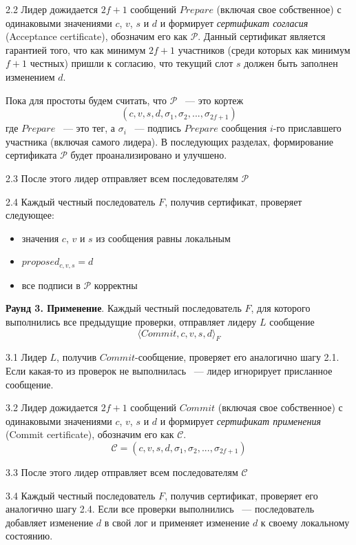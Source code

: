 2.2 Лидер дожидается $2f+1$ сообщений $Prepare$ (включая свое собственное) с одинаковыми значениями $c$, $v$, $s$ и $d$ и формирует \textit{сертификат согласия} (Acceptance certificate), обозначим его как $\mathcal{P}$. Данный сертификат является гарантией того, что как минимум $2f+1$ участников (среди которых как минимум $f+1$ честных) пришли к согласию, что текущий слот $s$ должен быть заполнен изменением $d$.

Пока для простоты будем считать, что $\mathcal{P}$ ~--- это кортеж
$$(c, v, s, d, \sigma_1, \sigma_2, ..., \sigma_{2f+1})$$
где $Prepare$ ~--- это тег, а $\sigma_i$ ~--- подпись $Prepare$ сообщения $i$-го приславшего участника (включая самого лидера). 
В последующих разделах, формирование сертификата $\mathcal{P}$ будет проанализировано и улучшено.

2.3 После этого лидер отправляет всем последователям  $\mathcal{P}$

2.4 Каждый честный последователь $F$, получив сертификат, проверяет следующее:
\begin{itemize}
\item значения $c$, $v$ и $s$ из сообщения равны локальным
\item $proposed_{c,v,s} = d$
\item все подписи в $\mathcal{P}$ корректны
\end{itemize}
\vspace{10pt}

\textbf{Раунд 3. Применение}.
Каждый честный последователь $F$, для которого выполнились все предыдущие проверки, отправляет лидеру $L$ сообщение 
\[ \langle Commit, c, v, s, d \rangle_F \]

3.1 Лидер $L$, получив $Commit$-сообщение, проверяет его аналогично шагу 2.1.
Если какая-то из проверок не выполнилась ~--- лидер игнорирует присланное сообщение. 

3.2 Лидер дожидается $2f+1$ сообщений $Commit$ (включая свое собственное) с одинаковыми значениями $c$, $v$, $s$ и $d$ и формирует \textit{сертификат применения} (Commit certificate), обозначим его как $\mathcal{C}$.
$$\mathcal{C}=(c, v, s, d, \sigma_1, \sigma_2, ..., \sigma_{2f+1})$$

3.3 После этого лидер отправляет всем последователям  $\mathcal{C}$

3.4 Каждый честный последователь $F$, получив сертификат, проверяет его аналогично шагу 2.4.
Если все проверки выполнились ~--- последователь добавляет изменение $d$ в свой лог и  применяет изменение $d$ к своему локальному состоянию.
\vspace{10pt}

